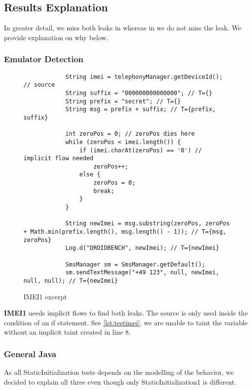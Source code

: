 \documentclass[../draft.tex]{subfiles}
\begin{document}
    \subsection{Results Explanation}
    In greater detail, we miss both leaks in  whereas in  we do not miss the leak. We provide explanation on why below.

    \subsubsection{Emulator Detection}
    \begin{figure}[ht]
        \begin{lstlisting}
            String imei = telephonyManager.getDeviceId(); // source
            String suffix = "000000000000000"; // T={}
            String prefix = "secret"; // T={}
            String msg = prefix + suffix; // T={prefix, suffix}

            int zeroPos = 0; // zeroPos dies here
            while (zeroPos < imei.length()) {
                if (imei.charAt(zeroPos) == '0') // implicit flow needed
                    zeroPos++;
                else {
                    zeroPos = 0;
                    break;
                }
            }
            
            String newImei = msg.substring(zeroPos, zeroPos + Math.min(prefix.length(), msg.length() - 1)); // T={msg, zeroPos}
            Log.d("DROIDBENCH", newImei); // T={newImei}
    
            SmsManager sm = SmsManager.getDefault();
            sm.sendTextMessage("+49 123", null, newImei, null, null); // T={newImei}
        \end{lstlisting}
        \caption{IMEI1 excerpt}
        \label{lst:testimei}
    \end{figure}

    \textbf{IMEI1} needs implicit flows to find both leaks. The source is only used inside the condition of an if statement. See \autoref{lst:testimei}, we are unable to taint the variable  without an implicit taint created in line 8. 

    \subsubsection{General Java}
    As all StaticInitialization tests depends on the modelling of the  behavior, we decided to explain all three even though only StaticInitialization1 is different.
\end{document}
